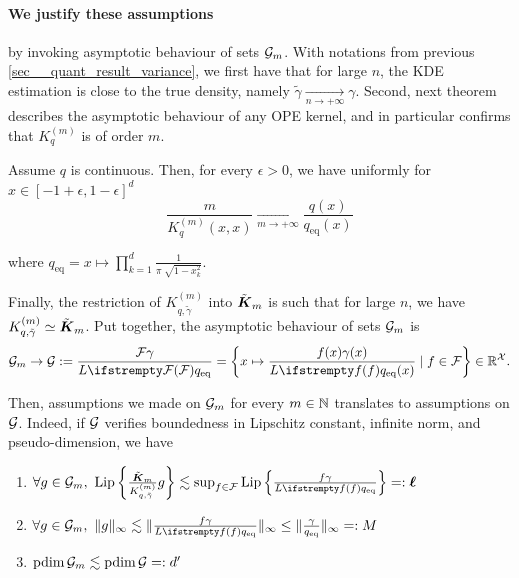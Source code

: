 \paragraph{We justify these assumptions} by invoking asymptotic behaviour of sets $\mathcal{G}_m$. With notations from previous \cref{sec__quant_result_variance}, we first have that for large $n$, the KDE estimation is close to the true density, namely $\tilde \gamma \xrightarrow[n \to +\infty]{} \gamma$. Second, next theorem describes the asymptotic behaviour of any OPE kernel, and in particular confirms that $K_q^{(m)}$ is of order $m$.
\begin{tcolorbox}
	\begin{theorem}
		Assume $q$ is continuous. Then, for every $\epsilon>0$, we have uniformly for $x\in [-1+\epsilon,1-\epsilon]^d$
		\begin{equation}
			\frac{m}{K_q^{(m)}(x, x)} \xrightarrow[m \to +\infty]{} \frac{q(x)}{q_{\mathrm{eq}}(x)}
		\end{equation}
	\end{theorem}
	where $q_{\mathrm{eq}} = x \mapsto \prod_{k=1}^d \frac{1}{\pi \sqrt[]{1-x_k^2}}$.
\end{tcolorbox}

Finally, the restriction of $K^{(m)}_{q, \tilde \gamma}$ into $\tilde{\boldsymbol K}_{m}$ is such that for large $n$, we have $K^{(m)}_{q, \tilde \gamma} \simeq \tilde{\boldsymbol K}_{m}$. Put together, the asymptotic behaviour of sets $\mathcal{G}_m$ is 
\begin{equation}
	\twoqset_m \to \twoqset := \frac{\qset\gamma}{\loss{\qset}q_{\mathrm{eq}}} = \left\{x \mapsto \frac{\query(x)\gamma(x)}{\loss{\query}q_{\mathrm{eq}}(x)} \mid \query \in \qset\right\} \in \RR^{\mathcal{X}}.
\end{equation}


 Then, assumptions we made on $\mathcal{G}_m$ for every $m\in \mathbb{N}$ translates to assumptions on $\mathcal{G}$. Indeed, if $\mathcal{G}$ verifies boundedness in Lipschitz constant, infinite norm, and pseudo-dimension, we have
\begin{enumerate}
	\item $\forall \twoquery \in \twoqset_m,\ \operatorname{Lip}\left\{\frac{\opekernel{m}}{K^{(m)}_{q, \tilde \gamma}}\twoquery \right\} \lesssim \sup_{\query \in \qset}\operatorname{Lip}\left\{\frac{\query\gamma}{\loss{\query}q_{\mathrm{eq}}} \right\} =: \lipschitz$
	\item $\forall \twoquery \in \twoqset_m,\ \|\twoquery\|_{\infty} \lesssim \|\frac{\query\gamma}{\loss{\query}q_{\mathrm{eq}}}\|_{\infty} \leq \|\frac{\gamma}{q_{\mathrm{eq}}}\|_{\infty} =:  \bound$
	\item $\operatorname{pdim}\mathcal{G}_m \lesssim \operatorname{pdim}\mathcal{G} =: {d'}$
\end{enumerate}

